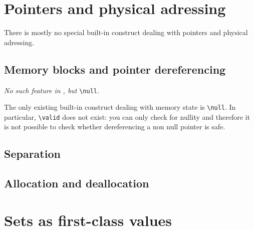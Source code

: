 
\section{Pointers and physical adressing}
\label{sec:pointers}

There is mostly no special built-in \eacsl construct dealing with pointers and
physical adressing.


\subsection{Memory blocks and pointer dereferencing}
\label{subsec:memory}
\emph{No such feature in \eacsl, but } \lstinline|\null|\emph{.}

The only existing built-in construct dealing with memory state is
\lstinline|\null|.  In particular, \lstinline|\valid| does not exist: you can
only check for nullity and therefore it is not possible to check whether
dereferencing a non null pointer is safe.


\subsection{Separation}
\absent


\subsection{Allocation and deallocation}
\absent


\section{Sets as first-class values}
\nodiff

